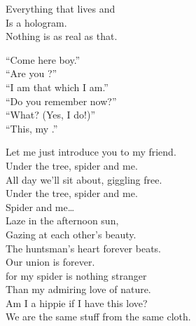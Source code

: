 
Everything that lives and  \\
Is a hologram. \\
Nothing is as real as that. \\


``Come here boy.'' \\
``Are you ?'' \\
``I am that which I am.'' \\

``Do you remember now?'' \\
``What? (Yes, I do!)'' \\
``This, my .'' \\









Let me just introduce you to my friend. \\
Under the tree, spider and me. \\
All day we'll sit about, giggling free. \\
Under the tree, spider and me. \\

Spider and me… \\

Laze in the afternoon sun, \\
Gazing at each other's beauty. \\
The huntsman's heart forever beats. \\
Our union is forever. \\

 for my spider is nothing stranger \\
Than my admiring love of nature. \\
Am I a hippie if I have this love? \\
We are the same stuff from the same cloth. \\


